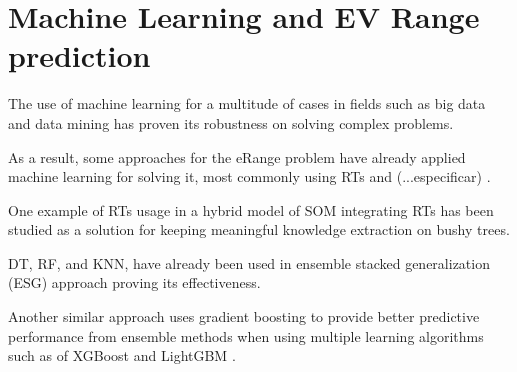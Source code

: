 \section{Machine Learning and EV Range prediction}

The use of machine learning for a multitude
of cases \citep{machineLearningCaseStudy} in fields such as 
big data \citep{machineLearningBigData, machineLearningBigData2}
and data mining \citep{businessDataMining} has 
proven its robustness on solving complex problems.

As a result, some approaches for the \gls{eRange}
problem have already applied machine learning 
for solving it, most commonly using \gls{RTs}
 and (...especificar) .

One example of \gls{RTs} usage in a hybrid model of \gls{SOM} 
integrating \gls{RTs} has been studied as a solution 
for keeping meaningful knowledge extraction on bushy trees.

\gls{DT}, \gls{RF}, and \gls{KNN}, have already been 
used in ensemble stacked generalization (ESG) approach 
\citep{eRangeMachineLearningEnsemble} proving its 
effectiveness.

Another similar approach uses gradient boosting 
to provide better predictive performance from
ensemble methods when using multiple learning algorithms
such as of \gls{XGBoost} and \gls{LightGBM}
\citep{machineLearningERange}.



